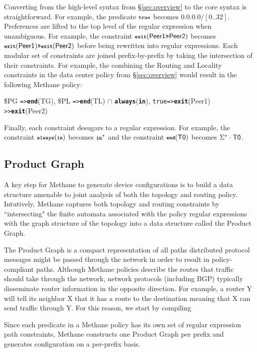 \documentclass{sig-alternate-10pt}
\newcommand{\sysname}{{\small \sf Methane}\xspace}
\newcommand{\CD}[1]{\texttt{\small #1}}  %
\newcommand{\KW}[1]{\texttt{\small\bfseries{#1}}}
\newcommand{\True}{\CD{true}}
\newcommand{\Prefer}{\texttt{>>}}
\newcommand{\Path}{\texttt{=>}}
\newcommand{\In}{\KW{in}}
\newcommand{\Exit}{\KW{exit}}
\newcommand{\End}{\KW{end}}
\newcommand{\Always}{\KW{always}}
\begin{document}
Converting from the high-level syntax from \S\ref{sec:overview} to the core syntax is straightforward. For example, the predicate $\True$ becomes $0.0.0.0/[0..32]$. Preferences are lifted to the top level of the regular expression when unambiguous. For example, the constraint $\Exit(\sf{Peer1} \Prefer \sf{Peer2})$ becomes $\Exit(\sf{Peer1}) \Prefer \Exit(\sf{Peer2})$ before being rewritten into regular expressions. Each modular set of constraints are joined prefix-by-prefix by taking the intersection of their constraints. For example, the combining the Routing and Locality constraints in the data center policy from \S\ref{sec:overview} would result in the following \sysname policy:
%
\begin{code}
\$PG  \Path \End(TG),
\$PL  \Path \End(TL) \ensuremath{\cap} \Always(\In),
\True \Path \Exit(Peer1) \Prefer \Exit(Peer2)
\end{code}
\noindent%
%
Finally, each constraint desugars to a regular expression. For example, the constraint $\Always(\In)$ becomes $\In^*$ and the constraint $\End({\small \mathsf{T0}})$ becomes $\Sigma^* \cdot \sf{T0}$.

\subsection{Product Graph}

A key step for \sysname to generate device configurations is to build a data structure amenable to joint analysis of both the topology and routing policy. Intutively, \sysname captures both topology and routing constraints by ``intersecting" the finite automata associated with the policy regular expressions with the graph structure of the topology into a data structure called the Product Graph.

The Product Graph is a compact representation of all paths distributed protocol messages might be passed through the network in order to result in policy-compliant paths.
Although \sysname policies describe the routes that traffic should take through the network, network protocols (including BGP) typically disseminate router information in the opposite direction.
For example, a router Y will tell its neighbor X that it has a route to the destination meaning that X can send traffic through Y. For this reason, we start by compiling

Since each predicate in a \sysname policy has its own set of regular expression path constraints, \sysname constructs one Product Graph per prefix and generates configuration on a per-prefix basis.
\end{document}
